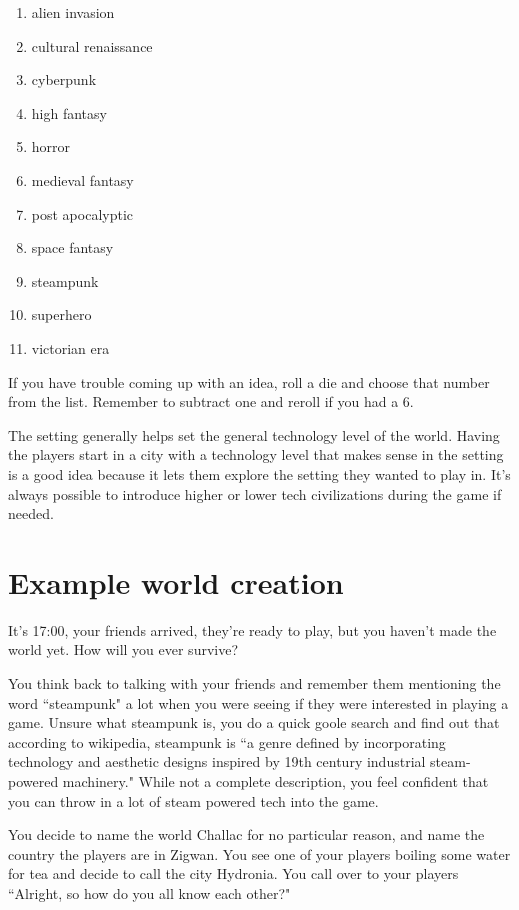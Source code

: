 \begin{enumerate}

    \item{alien invasion}
    \item{cultural renaissance}
    \item{cyberpunk}
    \item{high fantasy}
    \item{horror}
    \item{medieval fantasy}
    \item{post apocalyptic}
    \item{space fantasy}
    \item{steampunk}
    \item{superhero}
    \item{victorian era}

\end{enumerate}

If you have trouble coming up with an idea, roll a die and choose that number
from the list. Remember to subtract one and reroll if you had a 6.

The setting generally helps set the general technology level of the world.
Having the players start in a city with a technology level that makes sense
in the setting is a good idea because it lets them explore the setting they
wanted to play in. It's always possible to introduce higher or lower tech
civilizations during the game if needed.

\section*{Example world creation}

It's 17:00, your friends arrived, they're ready to play, but you haven't made
the world yet. How will you ever survive?

You think back to talking with your friends and remember them mentioning the
word ``steampunk" a lot when you were seeing if they were interested in playing
a game. Unsure what steampunk is, you do a quick goole search and find out that
according to wikipedia, steampunk is ``a genre defined by incorporating
technology and aesthetic designs inspired by 19th century industrial
steam-powered machinery." While not a complete description, you feel confident
that you can throw in a lot of steam powered tech into the game.

You decide to name the world Challac for no particular reason, and name the
country the players are in Zigwan. You see one of your players boiling some
water for tea and decide to call the city Hydronia. You call over to your
players ``Alright, so how do you all know each other?"

